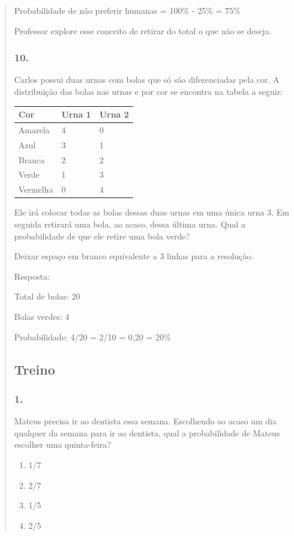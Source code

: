 \begin{enumerate}
\begin{escolha}
\begin{enumerate}
\begin{itemize}
\begin{itemize}
\begin{escolha}
\begin{quote}
\begin{escolha}
Probabilidade de não preferir humanas = 100\% - 25\% = 75\%

Professor explore esse conceito de retirar do total o que não se deseja.

\subsubsection{10.}\label{section-87}

Carlos possui duas urnas com bolas que só são diferenciadas pela cor. A
distribuição das bolas nas urnas e por cor se encontra na tabela a
seguir:

\begin{longtable}[]{@{}lll@{}}
\toprule
Cor & Urna 1 & Urna 2\tabularnewline
\midrule
\endhead
Amarela & 4 & 0\tabularnewline
Azul & 3 & 1\tabularnewline
Branca & 2 & 2\tabularnewline
Verde & 1 & 3\tabularnewline
Vermelha & 0 & 4\tabularnewline
\bottomrule
\end{longtable}

Ele irá colocar todas as bolas dessas duas urnas em uma única urna 3. Em
seguida retirará uma bola, ao acaso, dessa última urna. Qual a
probabilidade de que ele retire uma bola verde?

Deixar espaço em branco equivalente a 3 linhas para a resolução.

Resposta:

Total de bolas: 20

Bolas verdes: 4

Probabilidade: 4/20 = 2/10 = 0,20 = 20\%

\subsection{Treino}\label{treino-6}

\subsubsection{1.}\label{section-88}

Mateus precisa ir ao dentista essa semana. Escolhendo ao acaso um dia
qualquer da semana para ir ao dentista, qual a probabilidade de Mateus
escolher uma quinta-feira?

\begin{enumerate}
\def\labelenumi{\alph{enumi})}
\item
  1/7
\item
  2/7
\item
  1/5
\item
  2/5
\end{enumerate}


\end{escolha}
\end{quote}
\end{escolha}
\end{itemize}
\end{itemize}
\end{enumerate}
\end{escolha}
\end{enumerate}
